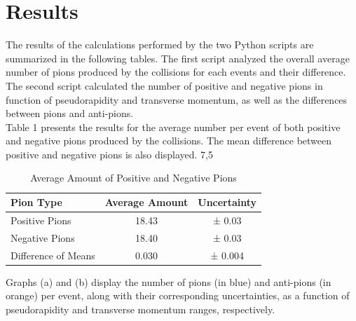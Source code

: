 
\section*{Results}

The results of the calculations performed by the two Python scripts are summarized in the following tables. The first script analyzed the overall average number of pions produced by the collisions for each events and their difference.
The second script calculated the number of positive and negative pions in function of pseudorapidity and transverse momentum, as well as the differences between pions and anti-pions.
\\

Table 1 presents the results for the average number per event of both positive and negative pions produced by the collisions. The mean difference between positive and negative pions is also displayed.
7,5
\begin{table}[ht]
    \centering
    \caption{Average Amount of Positive and Negative Pions}
    \begin{tabular}{|l|c|c|}
        \hline
        Pion Type                      & {Average Amount}       & {Uncertainty}         \\ \hline
        Positive Pions                 & 18.43                & ± 0.03             \\ \hline
        Negative Pions                 & 18.40                & ± 0.03              \\ \hline
        Difference of Means            & 0.030                 & ± 0.004            \\ \hline
    \end{tabular}
\end{table}
\newpage
Graphs (a) and (b) display the number of pions (in blue) and anti-pions (in orange) per event, along with their corresponding uncertainties, as a function of pseudorapidity and transverse momentum ranges, respectively.

